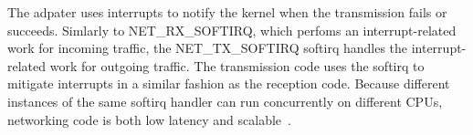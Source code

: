 The adpater uses interrupts to notify the kernel when the transmission fails or succeeds.
Simlarly to NET\_RX\_SOFTIRQ, which perfoms an interrupt-related work for incoming traffic,
the NET\_TX\_SOFTIRQ softirq handles the interrupt-related work for outgoing traffic.
The transmission code uses the softirq to mitigate interrupts in a similar fashion as the reception code.
Because different instances of the same softirq handler can run concurrently on different CPUs,
networking code is both low latency and scalable~\cite{understanding-internals}.


